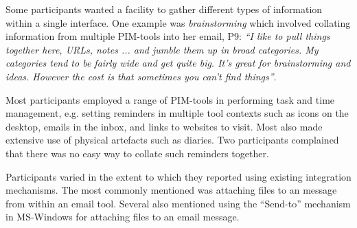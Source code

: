 Some participants wanted a facility to gather different types of information within a single interface. One example was \textit{brainstorming} which involved collating information from multiple PIM-tools into her email, P9: \textit{``I like to pull things together here, URLs, notes ... and jumble them up in broad categories. My categories tend to be fairly wide and get quite big.  It's great for brainstorming and ideas. However the cost is that sometimes you can't find things''}.

Most participants employed a range of PIM-tools in performing task and time management, e.g. setting reminders in multiple tool contexts such as icons on the desktop, emails in the inbox, and links to websites to visit. Most also made extensive use of physical artefacts such as diaries.  Two participants complained that there was no easy way to collate such reminders together.

Participants varied in the extent to which they reported using existing integration mechanisms.  The most commonly mentioned was attaching files to an message from within an email tool.  Several also mentioned using the ``Send-to'' mechanism in MS-Windows for attaching files to an email message.  %

